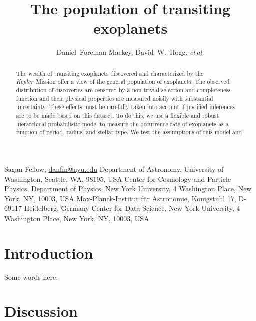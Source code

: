\documentclass[12pt,preprint]{aastex}
\newcommand{\project}[1]{\textsl{#1}}
\newcommand{\kepler}{\project{Kepler}}
\newcommand{\foreign}[1]{\emph{#1}}
\newcommand{\etal}{\foreign{et\,al.}}
\newcommand{\sectlabel}[1]{\label{sect:#1}}
\begin{document}
\title{%
    The population of transiting exoplanets
}

\newcommand{\uw}{2}
\newcommand{\nyu}{3}
\newcommand{\mpia}{4}
\newcommand{\cds}{5}
\author{%
    Daniel~Foreman-Mackey\altaffilmark{1,\uw},
    David~W.~Hogg\altaffilmark{\nyu,\mpia,\cds},
    \etal
}
         {Sagan Fellow; \url{danfm@nyu.edu}}
\altaffiltext{\uw}       {Department of Astronomy, University of Washington,
                          Seattle, WA, 98195, USA}
\altaffiltext{\nyu}      {Center for Cosmology and Particle Physics,
                          Department of Physics, New York University,
                          4 Washington Place, New York, NY, 10003, USA}
\altaffiltext{\mpia}     {Max-Planck-Institut f\"ur Astronomie,
                          K\"onigstuhl 17, D-69117 Heidelberg, Germany}
\altaffiltext{\cds}      {Center for Data Science,
                          New York University,
                          4 Washington Place, New York, NY, 10003, USA}

\begin{abstract}

The wealth of transiting exoplanets discovered and characterized by the
\kepler\ Mission offer a view of the general population of exoplanets.
The observed distribution of discoveries are censored by a non-trivial
selection and completeness function and their physical properties are measured
noisily with substantial uncertainty.
These effects must be carefully taken into account if justified inferences are
to be made based on this dataset.
To do this, we use a flexible and robust hierarchical probabilistic model to
measure the occurrence rate of exoplanets as a function of period, radius, and
stellar type.
We test the assumptions of this model and

\end{abstract}


\section{Introduction}
\sectlabel{intro}

Some words here.

\citet{Foreman-Mackey:2014}

\section{Discussion}
\end{document}
